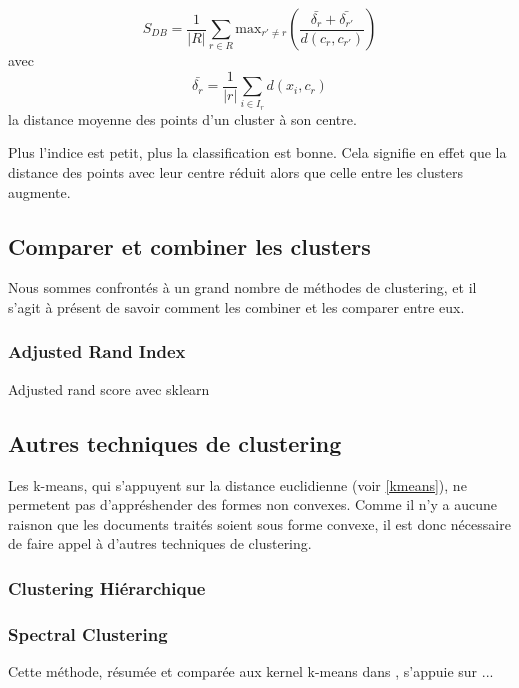 \[
S_{DB}  = \frac{1}{|R|}\sum_{r\in R}\mathrm{max}_{r'\neq r}\left(\frac{\bar{\delta_r}+\bar{\delta_{r'}}}{d(c_r,c_{r'})}\right)
\]
avec
\[\bar{\delta_r} = \frac{1}{|r|}\sum_{i \in I_r}d(x_i,c_r)\]
la distance moyenne des points d'un cluster à son centre.

Plus l'indice est petit, plus la classification est bonne. Cela signifie en effet que la distance des points avec leur centre réduit alors que celle entre les clusters augmente.

\subsection{Comparer et combiner les clusters}
Nous sommes confrontés à un grand nombre de méthodes de clustering, et il s'agit à présent de savoir comment les combiner et les comparer entre eux.

\subsubsection{Adjusted Rand Index}
Adjusted rand score avec sklearn 

\subsection{Autres techniques de clustering}
Les k-means, qui s'appuyent sur la distance euclidienne (voir \ref{kmeans}), ne permetent pas d'appréshender des formes non convexes. Comme il n'y a aucune raisnon que les documents traités soient sous forme convexe, il est donc nécessaire de faire appel à d'autres techniques de clustering.

\subsubsection{Clustering Hiérarchique}

\subsubsection{Spectral Clustering}
Cette méthode, résumée et comparée aux kernel k-means dans \cite{kernelSpectral2004}, s'appuie sur ...